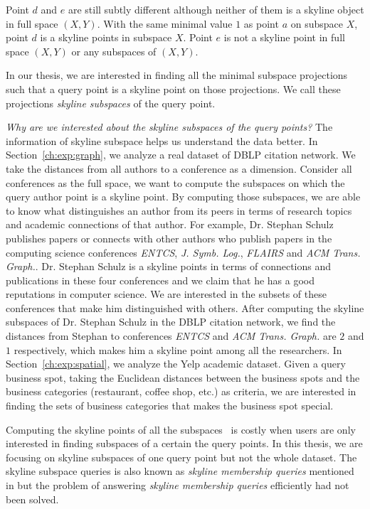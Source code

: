 Point $d$ and $e$ are still subtly different although neither of them is a skyline object in full space $(X, Y)$. With the same minimal value $1$ as point $a$ on subspace $X$, point $d$ is a skyline points in subspace $X$. Point $e$ is not a skyline point in full space $(X, Y)$ or any subspaces of $(X, Y)$.

In our thesis, we are interested in finding all the minimal subspace projections such that a query point is a skyline point on those projections. We call these projections \emph{skyline subspaces} of the query point.

\emph{Why are we interested about the skyline subspaces of the query points?} The information of skyline subspace helps us understand the data better. In Section~\ref{ch:exp:graph}, we analyze a real dataset of DBLP citation network. We take the distances from all authors to a conference as a dimension. Consider all conferences as the full space, we want to compute the subspaces on which the query author point is a skyline point. By computing those subspaces, we are able to know what distinguishes an author from its peers in terms of research topics and academic connections of that author. For example, Dr. Stephan Schulz publishes papers or connects with other authors who publish papers in the computing science conferences \emph{ENTCS}, \emph{J. Symb. Log.}, \emph{FLAIRS} and \emph{ACM Trans. Graph.}. Dr. Stephan Schulz is a skyline points in terms of connections and publications in these four conferences and we claim that he has a good reputations in computer science. We are interested in the subsets of these conferences that make him distinguished with others. After computing the skyline subspaces of Dr. Stephan Schulz in the DBLP citation network, we find the distances from Stephan to conferences \emph{ENTCS} and \emph{ACM Trans. Graph.} are $2$ and $1$ respectively, which makes him a skyline point among all the researchers. In Section~\ref{ch:exp:spatial}, we analyze the Yelp academic dataset. Given a query business spot, taking the Euclidean distances between the business spots and the business categories (restaurant, coffee shop, etc.) as criteria, we are interested in finding the sets of business categories that makes the business spot special.

Computing the skyline points of all the subspaces~\cite{pei2005catching, yuan2005efficient} is costly when users are only interested in finding subspaces of a certain the query points. In this thesis, we are focusing on skyline subspaces of one query point but not the whole dataset. The skyline subspace queries is also known as \emph{skyline membership queries} mentioned in \cite{pei2005catching} but the problem of answering \emph{skyline membership queries} efficiently had not been solved.

